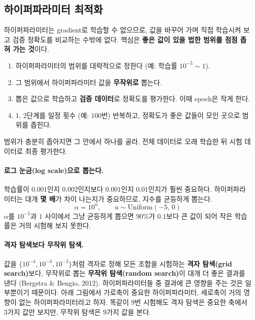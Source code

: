 \documentclass[11pt,a4paper]{article}
\begin{document}
\subsection{하이퍼파라미터 최적화}\label{sec:hpo}

하이퍼파라미터는 gradient로 학습할 수 없으므로, 값을 바꾸어 가며 직접 학습시켜 보고 검증 정확도를 비교하는 수밖에 없다.
핵심은 \textbf{좋은 값이 있을 법한 범위를 점점 좁혀 가는 것}이다.

\begin{keybox}
\begin{enumerate}[label=\textbf{\arabic*단계}, leftmargin=4.2em, start=0]
\item 하이퍼파라미터의 범위를 대략적으로 정한다 (예: 학습률 $10^{-5}\sim1$).
\item 그 범위에서 하이퍼파라미터 값을 \textbf{무작위로} 뽑는다.
\item 뽑은 값으로 학습하고 \textbf{검증 데이터}로 정확도를 평가한다. 이때 epoch은 작게 한다.
\item 1, 2단계를 일정 횟수 (예: $100$번) 반복하고, 정확도가 좋은 값들이 모인 곳으로 범위를 좁힌다.
\end{enumerate}
범위가 충분히 좁아지면 그 안에서 하나를 골라, 전체 데이터로 오래 학습한 뒤 시험 데이터로 최종 평가한다.
\end{keybox}

\paragraph{로그 눈금(log scale)으로 뽑는다.}
학습률이 $0.001$인지 $0.002$인지보다 $0.001$인지 $0.01$인지가 훨씬 중요하다.
하이퍼파라미터는 대개 \textbf{몇 배}가 차이 나는지가 중요하므로, 지수를 균등하게 뽑는다.
\[
\alpha=10^{u},\qquad u\sim\mathrm{Uniform}(-5,\,0)
\]
$\alpha$를 $10^{-5}$과 $1$ 사이에서 그냥 균등하게 뽑으면 $90\%$가 $0.1$보다 큰 값이 되어
작은 학습률은 거의 시험해 보지 못한다.

\paragraph{격자 탐색보다 무작위 탐색.}
값을 $\{10^{-4},10^{-3},10^{-2}\}$처럼 격자로 정해 모든 조합을 시험하는 \textbf{격자 탐색(grid search)}보다,
무작위로 뽑는 \textbf{무작위 탐색(random search)}이 대개 더 좋은 결과를 낸다 (Bergstra \& Bengio, 2012).
하이퍼파라미터들 중 결과에 큰 영향을 주는 것은 일부뿐이기 때문이다.
아래 그림에서 가로축이 중요한 하이퍼파라미터, 세로축이 거의 영향이 없는 하이퍼파라미터라고 하자.
똑같이 $9$번 시험해도 격자 탐색은 중요한 축에서 $3$가지 값만 보지만, 무작위 탐색은 $9$가지 값을 본다.
\end{document}

